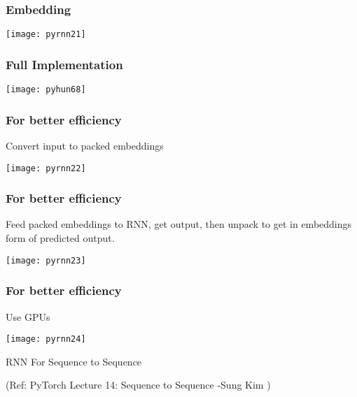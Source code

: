 \begin{frame}[fragile] \frametitle{Embedding}
\begin{center}
\texttt{[image: pyrnn21]}
\end{center}
\end{frame}



\begin{frame}[fragile] \frametitle{Full Implementation}
\begin{center}
\texttt{[image: pyhun68]}
\end{center}
\end{frame}

\begin{frame}[fragile] \frametitle{For better efficiency}
Convert input to packed embeddings
\begin{center}
\texttt{[image: pyrnn22]}
\end{center}
\end{frame}

\begin{frame}[fragile] \frametitle{For better efficiency}
Feed packed embeddings to RNN, get output, then unpack to get in embeddings form of predicted output.
\begin{center}
\texttt{[image: pyrnn23]}
\end{center}
\end{frame}

\begin{frame}[fragile] \frametitle{For better efficiency}
Use GPUs
\begin{center}
\texttt{[image: pyrnn24]}
\end{center}
\end{frame}

\begin{frame}
  \begin{center}
    {\Large RNN For Sequence to Sequence}
    
\tiny{(Ref:  PyTorch Lecture 14: Sequence to Sequence -Sung Kim )}
  \end{center}
\end{frame}

